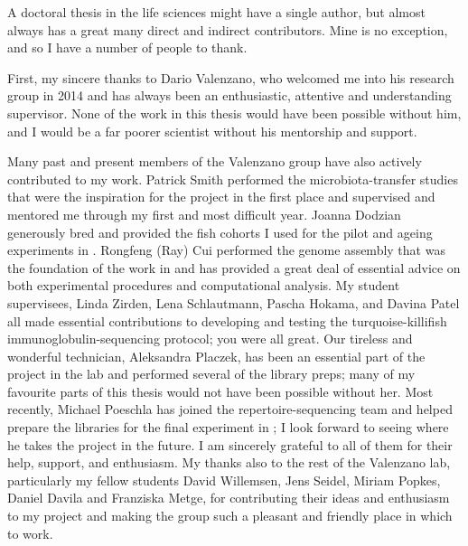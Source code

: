 
\begin{acknowledgements}      
A doctoral thesis in the life sciences might have a single author, but almost always has a great many direct and indirect contributors. Mine is no exception, and so I have a number of people to thank.

First, my sincere thanks to Dario Valenzano, who welcomed me into his research group in 2014 and has always been an enthusiastic, attentive and understanding supervisor. None of the work in this thesis would have been possible without him, and I would be a far poorer scientist without his mentorship and support.

Many past and present members of the Valenzano group have also actively contributed to my work. Patrick Smith performed the microbiota-transfer studies that were the inspiration for the project in the first place and supervised and mentored me through my first and most difficult year. Joanna Dodzian generously bred and provided the fish cohorts I used for the pilot and ageing experiments in . Rongfeng (Ray) Cui performed the genome assembly that was the foundation of the work in  and has provided a great deal of essential advice on both experimental procedures and computational analysis. My student supervisees, Linda Zirden, Lena Schlautmann, Pascha Hokama, and Davina Patel all made essential contributions to developing and testing the turquoise-killifish immunoglobulin-sequencing protocol; you were all great. Our tireless and wonderful technician, Aleksandra Placzek, has been an essential part of the \igseq project in the lab and performed several of the library preps; many of my favourite parts of this thesis would not have been possible without her. Most recently, Michael Poeschla has joined the repertoire-sequencing team and helped prepare the libraries for the final \igseq experiment in ; I look forward to seeing where he takes the project in the future. I am sincerely grateful to all of them for their help, support, and enthusiasm. My thanks also to the rest of the Valenzano lab, particularly my fellow students David Willemsen, Jens Seidel, Miriam Popkes, Daniel Davila and Franziska Metge, for contributing their ideas and enthusiasm to my project and making the group such a pleasant and friendly place in which to work.


\end{acknowledgements}
